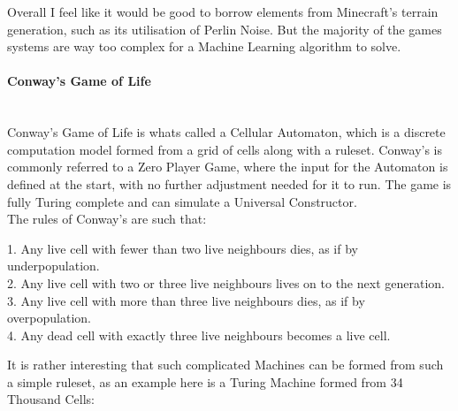 \begin{flushleft}
                        Overall I feel like it would be good to borrow elements from Minecraft's terrain generation, such as its utilisation of Perlin Noise.
                        But the majority of the games systems are way too complex for a Machine Learning algorithm to solve. \\

                        \vspace{1cm}
                    \paragraph{Conway's Game of Life} \mbox{} \\
                        \vspace{0.2cm}
                        Conway's Game of Life is whats called a Cellular Automaton, which is a discrete computation model formed from a grid of cells along with 
                        a ruleset. Conway's is commonly referred to a Zero Player Game, where the input for the Automaton is defined at the start, with no
                        further adjustment needed for it to run. The game is fully Turing complete and can simulate a Universal Constructor. \\
                        \vspace{0.2cm}
                        The rules of Conway's are such that: \\

                        
                        \begin{center}
                            \normalsize
                            1. Any live cell with fewer than two live neighbours dies, as if by underpopulation. \\
                            2. Any live cell with two or three live neighbours lives on to the next generation. \\
                            3. Any live cell with more than three live neighbours dies, as if by overpopulation. \\
                            4. Any dead cell with exactly three live neighbours becomes a live cell. \\
                        \end{center}

                        \vspace{0.2cm}
                        It is rather interesting that such complicated Machines can be formed from such a simple ruleset, as an example 
                        here is a Turing Machine formed from 34 Thousand Cells: \\


\end{flushleft}
